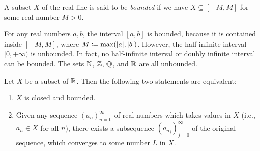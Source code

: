 \begin{defn}\label{i:9.1.22}
  A subset \(X\) of the real line is said to be \emph{bounded} if we have \(X \subseteq [-M, M]\) for some real number \(M > 0\).
\end{defn}

\begin{eg}\label{i:9.1.23}
  For any real numbers \(a, b\), the interval \([a, b]\) is bounded, because it is contained inside \([-M, M]\), where \(M \coloneqq \max(\abs{a}, \abs{b})\).
  However, the half-infinite interval \([0, +\infty)\) is unbounded.
  In fact, no half-infinite interval or doubly infinite interval can be bounded.
  The sets \(\mathbb{N}\), \(\mathbb{Z}\), \(\mathbb{Q}\), and \(\mathbb{R}\) are all unbounded.
\end{eg}

\begin{thm}\label{i:9.1.24}
  Let \(X\) be a subset of \(\mathbb{R}\).
  Then the following two statements are equivalent:
  \begin{enumerate}
    \item \(X\) is closed and bounded.
    \item Given any sequence \((a_n)_{n = 0}^\infty\) of real numbers which takes values in \(X\) (i.e., \(a_n \in X\) for all \(n\)), there exists a subsequence \((a_{n_j})_{j = 0}^\infty\) of the original sequence, which converges to some number \(L\) in \(X\).
  \end{enumerate}
\end{thm}

